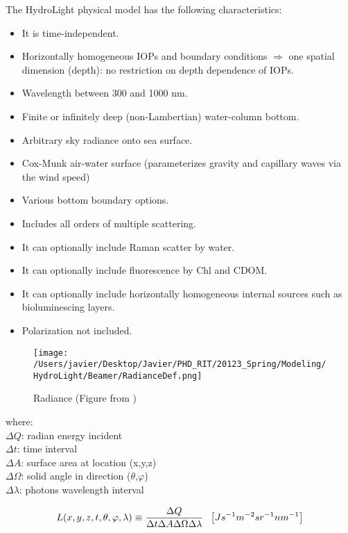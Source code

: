 The HydroLight physical model has the following characteristics:

\begin{itemize}
	\item It is time-independent.
	\item Horizontally homogeneous IOPs and boundary conditions $\Rightarrow$ one spatial dimension (depth): no restriction on depth dependence of IOPs.
	\item Wavelength between 300 and 1000 nm.
	\item Finite or infinitely deep (non-Lambertian) water-column bottom.
	\item Arbitrary sky radiance onto sea surface.
	\item Cox-Munk air-water surface (parameterizes gravity and capillary waves via the wind speed)
	\item Various bottom boundary options.
	\item Includes all orders of multiple scattering.
	\item It can optionally include Raman scatter by water.
	\item It can optionally include fluorescence by Chl and CDOM.
	\item It can optionally include horizontally homogeneous internal sources such as bioluminescing layers.
	\item Polarization not included.
\end{itemize}

\begin{figure}[H]
	\centering
	\texttt{[image: /Users/javier/Desktop/Javier/PHD\_RIT/20123\_Spring/Modeling/HydroLight/Beamer/RadianceDef.png]}
\caption{Radiance (Figure from \cite{Mobley:2001}) \label{fig:radiance} } 
\end{figure}
where:\\
			\noindent $\Delta Q$: radian energy incident \\
			$\Delta t$: time interval \\
			$\Delta A$: surface area at location (x,y,z)\\
			$\Delta\Omega$: solid angle in direction ($\theta$,$\varphi$) \\
			$\Delta\lambda$: photons wavelength interval

\begin{equation}
	\small L(x,y,z,t,\theta,\varphi,\lambda)\equiv\frac{\Delta Q}{\Delta t\Delta A\Delta\Omega\Delta\lambda}~~\left[ Js^{-1}m^{-2}sr^{-1}nm^{-1} \right]
\end{equation}

